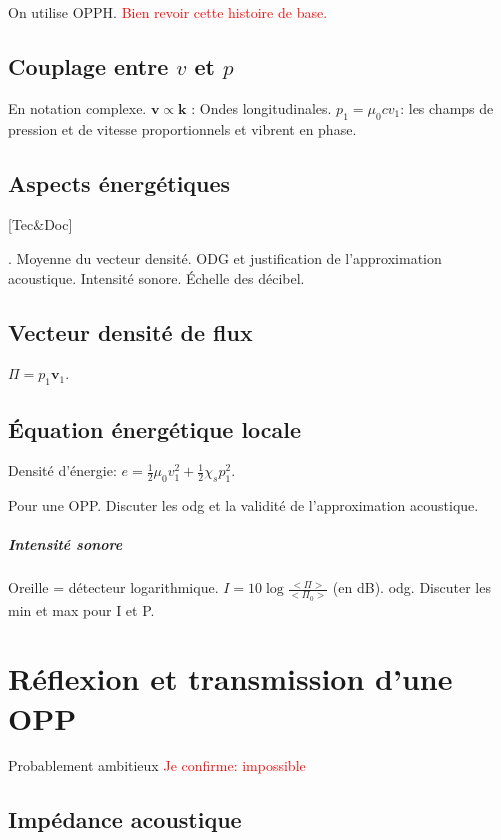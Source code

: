\documentclass[11pt]{report}
\numberwithin{figure}{section}
\numberwithin{equation}{section}
\numberwithin{table}{section}
\newcommand{\1}{\boldsymbol{1}}
\begin{document}
On utilise OPPH. \textcolor{red}{Bien revoir cette histoire de base.}

\subsection{Couplage entre $v$ et $p$}

En notation complexe. $\bm v \propto \bm k$ : Ondes longitudinales. $p_1 = \mu_0 c v_1$: les champs de pression et de vitesse proportionnels et vibrent en phase.


\subsection{Aspects énergétiques}

[Tec\&Doc]

. Moyenne du vecteur densité. ODG et justification de l'approximation acoustique. Intensité sonore. Échelle des décibel.

\subsection{Vecteur densité de flux}

$\Pi = p_1 \bm v_1$.

\subsection{Équation énergétique locale}

Densité d'énergie: $e = \frac{1}{2} \mu_0 v_1^2 + \frac{1}{2} \chi_s p_1^2$.

Pour une OPP. Discuter les odg et la validité de l'approximation acoustique.

\subparagraph{Intensité sonore}

Oreille = détecteur logarithmique. $I = 10 \log \frac{<\Pi>}{<\Pi_0>}$ (en dB). odg. Discuter les min et max pour I et P.

\section{Réflexion et transmission d'une OPP}

\textcolor{mycolor5}{Probablement ambitieux} \textcolor{red}{Je confirme: impossible}

\subsection{Impédance acoustique}
\end{document}
